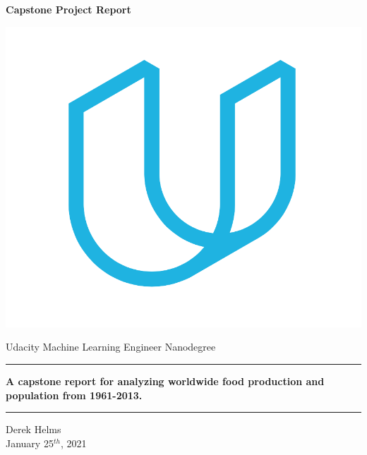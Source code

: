 \documentclass[12pt, a4paper]{article}
\begin{document}
\begin{spacing}{1.1}

	\begin{titlepage}
		\begin{center}
			\vspace*{1.4cm}
			
			\Huge \textbf{Capstone Project Report}
			
			\vspace*{1cm}
			
			\includegraphics[scale=.5]{logo}
			
			\vspace*{1cm}
			
			\LARGE {Udacity Machine Learning Engineer Nanodegree}
			
			\vspace*{1cm}
			
			\hrule \vspace*{.5cm}
			
			\Large \textbf{A capstone report for analyzing worldwide food production and population from 1961-2013.}
			
			\vspace*{.5cm} \hrule
			
			\vspace*{1cm}
			
			\Large Derek Helms \\
			\Large January 25$^{th}$, 2021
		\end{center}
	\end{titlepage} \newpage


\end{spacing}
\end{document}
